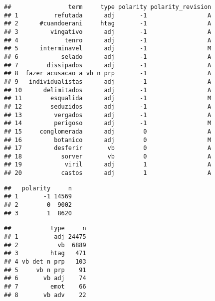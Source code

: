 \documentclass[
]{article}
\newenvironment{Shaded}{\begin{snugshade}}{\end{snugshade}}
\newcommand{\CommentTok}[1]{\textcolor[rgb]{0.56,0.35,0.01}{\textit{#1}}}
\newcommand{\DataTypeTok}[1]{\textcolor[rgb]{0.13,0.29,0.53}{#1}}
\newcommand{\FloatTok}[1]{\textcolor[rgb]{0.00,0.00,0.81}{#1}}
\newcommand{\KeywordTok}[1]{\textcolor[rgb]{0.13,0.29,0.53}{\textbf{#1}}}
\newcommand{\NormalTok}[1]{#1}
\newcommand{\OperatorTok}[1]{\textcolor[rgb]{0.81,0.36,0.00}{\textbf{#1}}}
\newcommand{\OtherTok}[1]{\textcolor[rgb]{0.56,0.35,0.01}{#1}}
\newcommand{\StringTok}[1]{\textcolor[rgb]{0.31,0.60,0.02}{#1}}
\begin{document}
\begin{verbatim}
##                term     type polarity polarity_revision
## 1          refutada      adj       -1                 A
## 2      #cuandoerani     htag       -1                 A
## 3         vingativo      adj       -1                 A
## 4             tenro      adj       -1                 A
## 5      interminavel      adj       -1                 M
## 6            selado      adj       -1                 A
## 7        dissipados      adj       -1                 A
## 8  fazer acusacao a vb n prp       -1                 A
## 9   individualistas      adj       -1                 A
## 10      delimitados      adj       -1                 A
## 11        esqualida      adj       -1                 M
## 12        seduzidos      adj       -1                 A
## 13         vergados      adj       -1                 A
## 14         perigoso      adj       -1                 M
## 15     conglomerada      adj        0                 A
## 16         botanico      adj        0                 M
## 17         desferir       vb        0                 A
## 18           sorver       vb        0                 A
## 19            viril      adj        1                 A
## 20           castos      adj        1                 A
\end{verbatim}

\begin{Shaded}
\end{Shaded}

\begin{verbatim}
##   polarity     n
## 1       -1 14569
## 2        0  9002
## 3        1  8620
\end{verbatim}

\begin{Shaded}
\end{Shaded}

\begin{verbatim}
##           type     n
## 1          adj 24475
## 2           vb  6889
## 3         htag   471
## 4 vb det n prp   103
## 5     vb n prp    91
## 6       vb adj    74
## 7         emot    66
## 8       vb adv    22
\end{verbatim}
\end{document}
